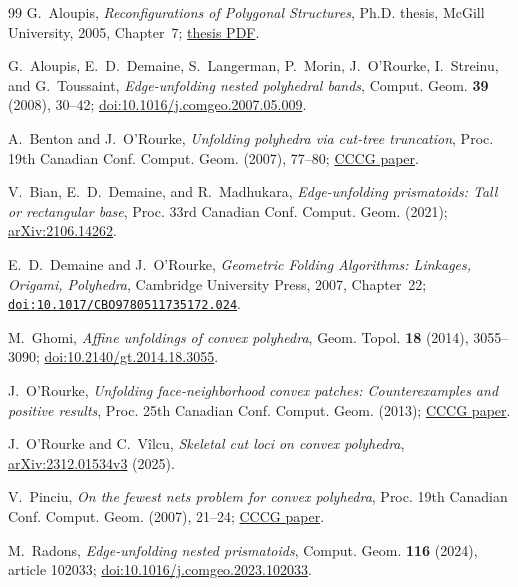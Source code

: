 \documentclass[a4paper,11pt]{amsart}
\begin{document}
\clearpage
\begin{thebibliography}{99}
G.~Aloupis, \emph{Reconfigurations of Polygonal Structures}, Ph.D. thesis, McGill University, 2005, Chapter~7; \href{https://citeseerx.ist.psu.edu/document?doi=8be1c6286e292285e85e92bec91d23e40ee34bb7\&repid=rep1\&type=pdf}{thesis PDF}.

G.~Aloupis, E.~D.~Demaine, S.~Langerman, P.~Morin, J.~O'Rourke, I.~Streinu, and G.~Toussaint,
\emph{Edge-unfolding nested polyhedral bands}, Comput. Geom. \textbf{39} (2008), 30--42; \href{https://doi.org/10.1016/j.comgeo.2007.05.009}{doi:10.1016/j.comgeo.2007.05.009}.

A.~Benton and J.~O'Rourke,
\emph{Unfolding polyhedra via cut-tree truncation}, Proc. 19th Canadian Conf. Comput. Geom. (2007), 77--80; \href{https://cccg.ca/proceedings/2007/03b4.pdf}{CCCG paper}.

V.~Bian, E.~D.~Demaine, and R.~Madhukara,
\emph{Edge-unfolding prismatoids: Tall or rectangular base}, Proc. 33rd Canadian Conf. Comput. Geom. (2021); \href{https://arxiv.org/abs/2106.14262}{arXiv:2106.14262}.

E.~D.~Demaine and J.~O'Rourke,
\emph{Geometric Folding Algorithms: Linkages, Origami, Polyhedra}, Cambridge University Press, 2007, Chapter~22; \href{https://doi.org/10.1017/CBO9780511735172.024}{\nolinkurl{doi:10.1017/CBO9780511735172.024}}.

M.~Ghomi, \emph{Affine unfoldings of convex polyhedra}, Geom. Topol. \textbf{18} (2014), 3055--3090; \href{https://doi.org/10.2140/gt.2014.18.3055}{doi:10.2140/gt.2014.18.3055}.

J.~O'Rourke,
\emph{Unfolding face-neighborhood convex patches: Counterexamples and positive results}, Proc. 25th Canadian Conf. Comput. Geom. (2013); \href{https://cccg.ca/proceedings/2013/papers/paper_22.pdf}{CCCG paper}.

J.~O'Rourke and C.~V\^ilcu,
\emph{Skeletal cut loci on convex polyhedra}, \href{https://arxiv.org/abs/2312.01534v3}{arXiv:2312.01534v3} (2025).

V.~Pinciu,
\emph{On the fewest nets problem for convex polyhedra}, Proc. 19th Canadian Conf. Comput. Geom. (2007), 21--24; \href{https://cccg.ca/proceedings/2007/01a4.pdf}{CCCG paper}.

M.~Radons,
\emph{Edge-unfolding nested prismatoids}, Comput. Geom. \textbf{116} (2024), article 102033; \href{https://doi.org/10.1016/j.comgeo.2023.102033}{doi:10.1016/j.comgeo.2023.102033}.
\end{thebibliography}
\end{document}
